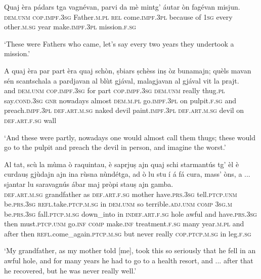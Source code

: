 \begin{linenumbers}
\gll   Quaj èra pádars tga vagnévan, parvi da mè mintg’ áutar òn fagévan misjun. \\
  \textsc{dem.unm} \textsc{cop.impf.3sg} Father.\textsc{m.pl} \textsc{rel} come.\textsc{impf.3pl} because of \textsc{1sg} every other.\textsc{m.sg} year make.\textsc{impf.3pl} mission.\textsc{f.sg} \\
\end{linenumbers}
\medskip
\glt `These were Fathers who came, let’s say every two years they undertook a mission.'
\medskip

 \begin{linenumbers}
\gll  A quaj èra par part èra quaj schòn, ṣbiars ṣchèss inṣ òz bunamajn; quèls mavan sén scantschala a pardjavan al blùt gjával, malagjavan al gjával vit la prajt. \\
and  \textsc{dem.unm} \textsc{cop.impf.3sg} for part \textsc{cop.impf.3sg} \textsc{dem.unm} really thug.\textsc{pl} say.\textsc{cond.3sg} \textsc{gnr} nowadays almost \textsc{dem.m.pl} go.\textsc{impf.3pl} on pulpit.\textsc{f.sg} and preach.\textsc{impf.3pl} \textsc{def.art.m.sg} naked devil paint.\textsc{impf.3pl} \textsc{def.art.m.sg} devil on \textsc{def.art.f.sg} wall\\
\end{linenumbers}
\medskip
\glt `And these were partly, nowadays one would almost call them thugs; these would go to the pulpit and preach the devil in person, and imagine the worst.'
\medskip

\begin{linenumbers}
\gll  Al tat, scù la mùma ò raquintau, è saprjuṣ ajn quaj schi starmantús tg’ èl è curdauṣ gjùdajn ajn ina rùsna nùndétga, ad ò lu stu í á fá cura, mass’ òns, a ... sjantar lu saravagnús ábar maj pròpi stauṣ ajn gamba.  \\
 \textsc{def.art.m.sg} grandfather as  \textsc{def.art.f.sg} mother have.\textsc{prs.3sg} tell.\textsc{ptcp.unm} be.\textsc{prs.3sg} \textsc{refl.}take.\textsc{ptcp.m.sg} in \textsc{dem.unm} so terrible.\textsc{adj.unm} \textsc{comp} \textsc{3sg.m} be.\textsc{prs.3sg} fall.\textsc{ptcp.m.sg} down\_into in \textsc{indef.art.f.sg} hole awful and have.\textsc{prs.3sg} then must.\textsc{ptcp.unm} go.\textsc{inf} \textsc{comp} make.\textsc{inf} treatment.\textsc{f.sg} many year.\textsc{m.pl} and {} after then \textsc{refl}.come\_again.\textsc{ptcp.m.sg} but never really \textsc{cop.ptcp.m.sg} in leg.\textsc{f.sg}\\
\end{linenumbers}
\medskip
\glt `My grandfather, as my mother told [me], took this so seriously that he fell in an awful hole, and for many years he had to go to a health resort, and ... after that he recovered, but he  was never really well.'
\medskip

